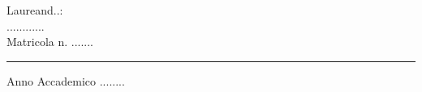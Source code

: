 \begin{titlepage}
\begin{flushleft}
    \end{flushleft}

    \vspace*{5mm}

    \begin{flushright}
        {\fontsize{17}{17}\selectfont 
            Laureand..:\\
            ............\\
            Matricola n. .......\\
        }

    \end{flushright}

 
    \vspace*{5mm}

    \rule{0.8\textwidth}{0.4pt}
    \begin{center}
    {\fontsize{17}{17}\selectfont 
        Anno Accademico ........
    }
    \end{center}
    
    
\end{titlepage}
\restoregeometry